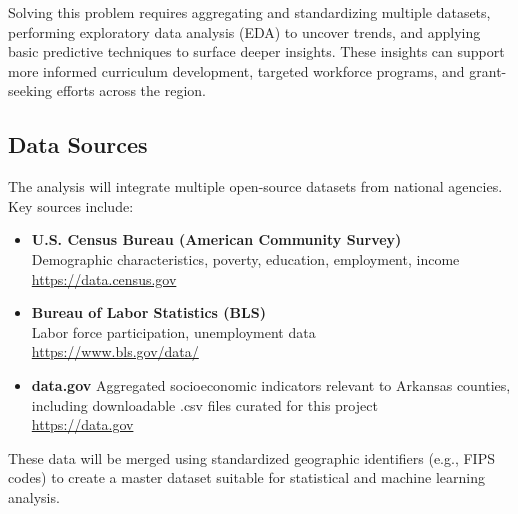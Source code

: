 \documentclass{llncs}
\begin{document}
Solving this problem requires aggregating and standardizing multiple datasets, performing exploratory data analysis (EDA) to uncover trends, and applying basic predictive techniques to surface deeper insights. These insights can support more informed curriculum development, targeted workforce programs, and grant-seeking efforts across the region.
\subsection{Data Sources}
The analysis will integrate multiple open-source datasets from national agencies. Key sources include:
\begin{itemize}
    \item \textbf{U.S. Census Bureau (American Community Survey)} \\
    Demographic characteristics, poverty, education, employment, income \\
    \href{https://data.census.gov}{https://data.census.gov}

    \item \textbf{Bureau of Labor Statistics (BLS)} \\
    Labor force participation, unemployment data \\
    \href{https://www.bls.gov/data/}{https://www.bls.gov/data/}
    
    \item \textbf{data.gov}
    Aggregated socioeconomic indicators relevant to Arkansas counties, including downloadable .csv files curated for this project\\
    \href{ https://data.gov}{ https://data.gov}
 
\end{itemize}
These data will be merged using standardized geographic identifiers (e.g., FIPS codes) to create a master dataset suitable for statistical and machine learning analysis.
\end{document}
